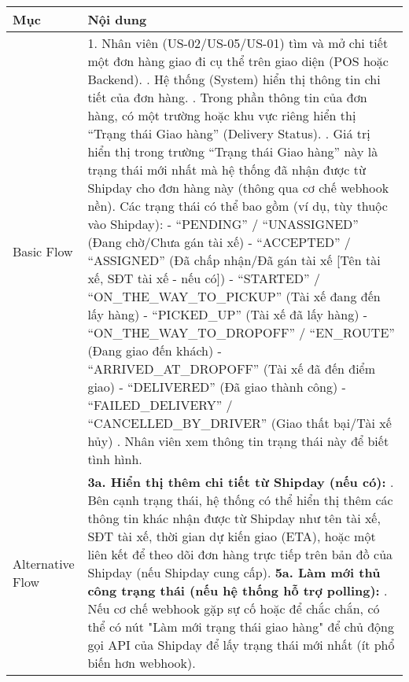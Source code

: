 \begin{longtable}{|m{4cm}|p{11cm}|}
\hline
\textbf{Mục} & \textbf{Nội dung} \\
\hline
Basic Flow & 1. Nhân viên (US-02/US-05/US-01) tìm và mở chi tiết một đơn hàng giao đi cụ thể trên giao diện (POS hoặc Backend). \newline 2. Hệ thống (System) hiển thị thông tin chi tiết của đơn hàng. \newline 3. Trong phần thông tin của đơn hàng, có một trường hoặc khu vực riêng hiển thị ``Trạng thái Giao hàng'' (Delivery Status). \newline 4. Giá trị hiển thị trong trường ``Trạng thái Giao hàng'' này là trạng thái mới nhất mà hệ thống đã nhận được từ Shipday cho đơn hàng này (thông qua cơ chế webhook nền). Các trạng thái có thể bao gồm (ví dụ, tùy thuộc vào Shipday): \newline    - ``PENDING'' / ``UNASSIGNED'' (Đang chờ/Chưa gán tài xế) \newline    - ``ACCEPTED'' / ``ASSIGNED'' (Đã chấp nhận/Đã gán tài xế [Tên tài xế, SĐT tài xế - nếu có]) \newline    - ``STARTED'' / ``ON\_THE\_WAY\_TO\_PICKUP'' (Tài xế đang đến lấy hàng) \newline    - ``PICKED\_UP'' (Tài xế đã lấy hàng) \newline    - ``ON\_THE\_WAY\_TO\_DROPOFF'' / ``EN\_ROUTE'' (Đang giao đến khách) \newline    - ``ARRIVED\_AT\_DROPOFF'' (Tài xế đã đến điểm giao) \newline    - ``DELIVERED'' (Đã giao thành công) \newline    - ``FAILED\_DELIVERY'' / ``CANCELLED\_BY\_DRIVER'' (Giao thất bại/Tài xế hủy) \newline 5. Nhân viên xem thông tin trạng thái này để biết tình hình. \\
\hline
Alternative Flow & \textbf{3a. Hiển thị thêm chi tiết từ Shipday (nếu có):} \newline    1. Bên cạnh trạng thái, hệ thống có thể hiển thị thêm các thông tin khác nhận được từ Shipday như tên tài xế, SĐT tài xế, thời gian dự kiến giao (ETA), hoặc một liên kết để theo dõi đơn hàng trực tiếp trên bản đồ của Shipday (nếu Shipday cung cấp). \newline \textbf{5a. Làm mới thủ công trạng thái (nếu hệ thống hỗ trợ polling):} \newline    1. Nếu cơ chế webhook gặp sự cố hoặc để chắc chắn, có thể có nút "Làm mới trạng thái giao hàng" để chủ động gọi API của Shipday để lấy trạng thái mới nhất (ít phổ biến hơn webhook). \\

\end{longtable}

